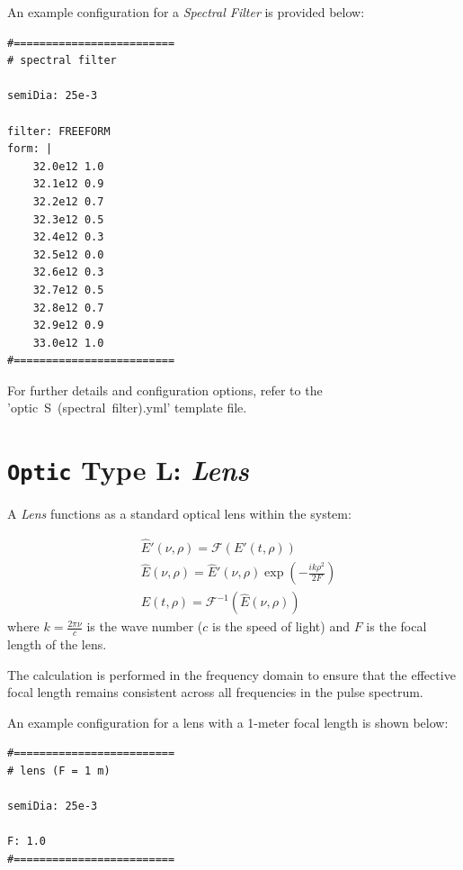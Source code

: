 \documentclass{report}
\begin{document}
An example configuration for a \textit{Spectral Filter} is provided below:

\begin{verbatim}
#=========================
# spectral filter

semiDia: 25e-3

filter: FREEFORM
form: |
    32.0e12 1.0
    32.1e12 0.9
    32.2e12 0.7
    32.3e12 0.5
    32.4e12 0.3
    32.5e12 0.0
    32.6e12 0.3
    32.7e12 0.5
    32.8e12 0.7
    32.9e12 0.9
    33.0e12 1.0
#=========================
\end{verbatim}

For further details and configuration options, refer to the 'optic~S~(spectral~filter).yml' template file.



\section{\texttt{Optic} Type L: \textit{Lens}}
A \textit{Lens} functions as a standard optical lens within the system:

\begin{equation}
 \begin{aligned}
  &\widehat{E}'(\nu,\rho) = \mathcal{F}(E'(t,\rho))\\
  &\widehat{E}(\nu,\rho) = \widehat{E}'(\nu,\rho) \exp\left( -\frac{i k \rho^2}{2 F} \right)\\
  &E(t,\rho) = \mathcal{F}^{-1}(\widehat{E}(\nu,\rho))
 \end{aligned}
\end{equation}
where \( k = \frac{2\pi\nu}{c} \) is the wave number (\( c \) is the speed of light) and \( F \) is the focal length of the lens.

The calculation is performed in the frequency domain to ensure that the effective focal length remains consistent across all frequencies in the pulse spectrum.

An example configuration for a lens with a 1-meter focal length is shown below:

\begin{verbatim}
#=========================
# lens (F = 1 m)

semiDia: 25e-3

F: 1.0
#=========================
\end{verbatim}


\end{document}

